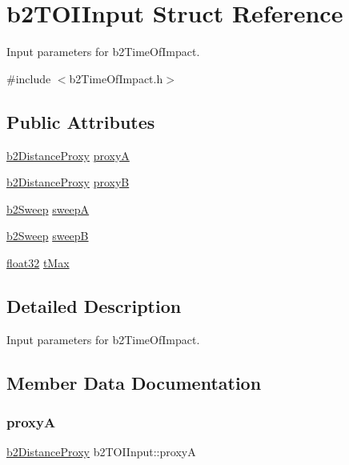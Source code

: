 \hypertarget{structb2_t_o_i_input}{}\section{b2\+T\+O\+I\+Input Struct Reference}
\label{structb2_t_o_i_input}


Input parameters for b2\+Time\+Of\+Impact.  




{\ttfamily \#include $<$b2\+Time\+Of\+Impact.\+h$>$}

\subsection*{Public Attributes}
\begin{DoxyCompactItemize}
\item 
\mbox{\hyperlink{structb2_distance_proxy}{b2\+Distance\+Proxy}} \mbox{\hyperlink{structb2_t_o_i_input_a5c5fb931435d92ac2d2080552400cd57}{proxyA}}
\item 
\mbox{\hyperlink{structb2_distance_proxy}{b2\+Distance\+Proxy}} \mbox{\hyperlink{structb2_t_o_i_input_a7f4e614d1c574006402e9610c984a93f}{proxyB}}
\item 
\mbox{\hyperlink{structb2_sweep}{b2\+Sweep}} \mbox{\hyperlink{structb2_t_o_i_input_adf63a4b9969aa839c2d520bf6d76148a}{sweepA}}
\item 
\mbox{\hyperlink{structb2_sweep}{b2\+Sweep}} \mbox{\hyperlink{structb2_t_o_i_input_af506b6adc7eca852f08460ec76c7b9a7}{sweepB}}
\item 
\mbox{\hyperlink{b2_settings_8h_aacdc525d6f7bddb3ae95d5c311bd06a1}{float32}} \mbox{\hyperlink{structb2_t_o_i_input_a365a434996de60957777a673918d3a5f}{t\+Max}}
\end{DoxyCompactItemize}


\subsection{Detailed Description}
Input parameters for b2\+Time\+Of\+Impact. 

\subsection{Member Data Documentation}
\mbox{\label{structb2_t_o_i_input_a5c5fb931435d92ac2d2080552400cd57}} 
\subsubsection{\texorpdfstring{proxyA}{proxyA}}
{\footnotesize\ttfamily \mbox{\hyperlink{structb2_distance_proxy}{b2\+Distance\+Proxy}} b2\+T\+O\+I\+Input\+::proxyA}

